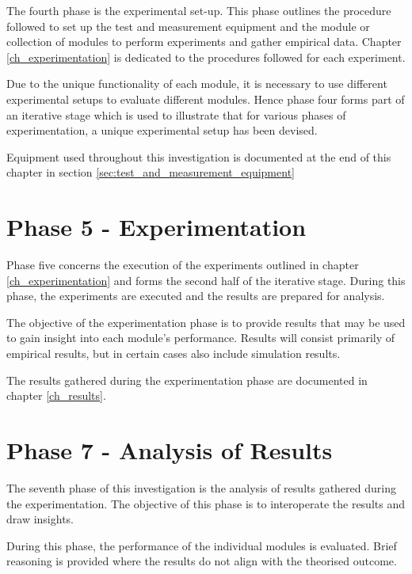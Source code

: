 The fourth phase is the experimental set-up. This phase outlines the procedure followed to set up the test and measurement equipment and the module or collection of modules to perform experiments and gather empirical data. Chapter \ref{ch_experimentation} is dedicated to the procedures followed for each experiment.

Due to the unique functionality of each module, it is necessary to use different experimental setups to evaluate different modules. Hence phase four forms part of an iterative stage which is used to illustrate that for various phases of experimentation, a unique experimental setup has been devised.

Equipment used throughout this investigation is documented at the end of this chapter in section \ref{sec:test_and_measurement_equipment}





\section{Phase 5 - Experimentation}

Phase five concerns the execution of the experiments outlined in chapter \ref{ch_experimentation} and forms the second half of the iterative stage. During this phase, the experiments are executed and the results are prepared for analysis.

The objective of the experimentation phase is to provide results that may be used to gain insight into each module's performance. Results will consist primarily of empirical results, but in certain cases also include simulation results.

The results gathered during the experimentation phase are documented in chapter \ref{ch_results}.


\section{Phase 7 - Analysis of Results}

The seventh phase of this investigation is the analysis of results gathered during the experimentation. The objective of this phase is to interoperate the results and draw insights.

During this phase, the performance of the individual modules is evaluated. Brief reasoning is provided where the results do not align with the theorised outcome.

